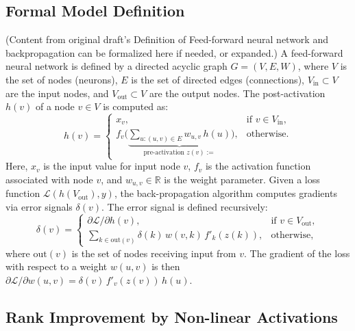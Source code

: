 \documentclass{article}
\newcommand{\Loss}{\mathcal{L}}
\newcommand{\R}{\mathbb{R}}
\begin{document}
\subsection{Formal Model Definition}
\label{app:model_definition}
(Content from original draft's Definition of Feed-forward neural network and backpropagation can be formalized here if needed, or expanded.)
A feed-forward neural network is defined by a directed acyclic graph $G=(V,E, W)$, where $V$ is the set of nodes (neurons), $E$ is the set of directed edges (connections), $V_{\text{in}} \subset V$ are the input nodes, and $V_{\text{out}} \subset V$ are the output nodes. The post-activation $h(v)$ of a node $v \in V$ is computed as:
\[
h(v)=
\begin{cases}
x_v, & \text{if } v\in V_{\text{in}},\\
f_v \Big(\underbrace{\sum_{u: (u,v)\in E}w_{u,v}\,h(u)}_{\text{pre-activation }z(v):=}\Big), &\text{otherwise}.
\end{cases}
\]
Here, $x_v$ is the input value for input node $v$, $f_v$ is the activation function associated with node $v$, and $w_{u,v} \in \R$ is the weight parameter.
Given a loss function $\Loss(h(V_{\text{out}}),y)$, the back-propagation algorithm computes gradients via error signals $\delta(v)$. The error signal is defined recursively:
\[
\delta(v)=
\begin{cases}
\partial\Loss/\partial h(v), & \text{if } v\in V_{\text{out}},\\[4pt]
\displaystyle\sum_{k\in\mathrm{out}(v)}\delta(k)\,w(v,k)\,f'_k(z(k)), &\text{otherwise},
\end{cases}
\]
where $\mathrm{out}(v)$ is the set of nodes receiving input from $v$. The gradient of the loss with respect to a weight $w(u,v)$ is then $\partial\Loss/\partial w(u,v)=\delta(v)\,f'_v(z(v))\,h(u)$.

\subsection{Rank Improvement by Non-linear Activations}
\label{app:theory_details} %
\end{document}
